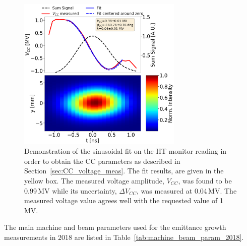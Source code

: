 \begin{figure}[!h]
   \centering         
   \includegraphics[width=0.7\textwidth]{images/Ch5/HT_VCC_callibration_20180905_135033_sin_fit_fixed_freq.png}
       \caption{Demonstration of the sinusoidal fit on the HT monitor reading in order to obtain the CC parameters as described in Section~\ref{sec:CC_voltage_meas}. The fit results, are given in the yellow box. The measured voltage amplitude, $V_{CC}$, was found to be 0.99\,MV while its uncertainty, $\Delta V_{CC}$, was measured at 0.04\,MV. The measured voltage value agrees well with the requested value of 1\,MV.}
       \label{fig:crabbing_sin_fit_MD5}
\end{figure}


The main machine and beam parameters used for the emittance growth measurements in 2018 are listed in Table~\ref{tab:machine_beam_param_2018}. %


